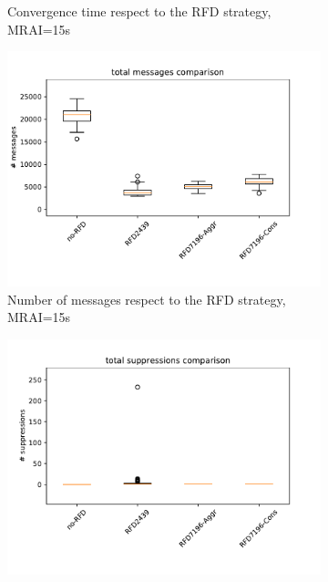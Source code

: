 \begin{figure}[H]
\begin{subfigure}[b]{0.325\textwidth}
         \caption{Convergence time respect to the RFD strategy, MRAI=15s}
         \label{fig:1000_RFD_MRAI30_time_elephant}
     \end{subfigure}
     \hfill
     \begin{subfigure}[b]{0.325\textwidth}
         \centering
         \includegraphics[width=\textwidth]{images/RFD/miceVSelephants/MultiMRAI/15/elephants/cisco_1000MRAI15_rfd_comparison_messages_boxplot.pdf}
         \caption{Number of messages respect to the RFD strategy, MRAI=15s}
         \label{fig:1000_RFD_MRAI30_messages_elephant}
     \end{subfigure}
     \hfill
     \begin{subfigure}[b]{0.325\textwidth}
         \centering
         \includegraphics[width=\textwidth]{images/RFD/miceVSelephants/MultiMRAI/15/elephants/cisco_1000MRAI15_rfd_comparison_suppressions_boxplot.pdf}

\end{subfigure}
\end{figure}
